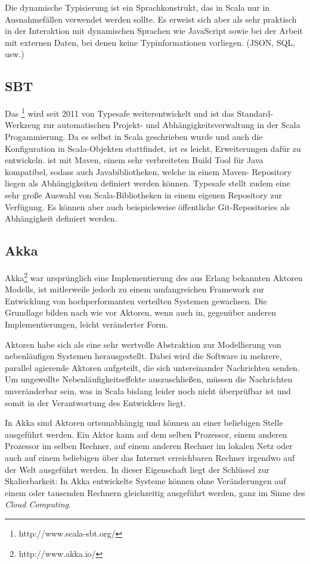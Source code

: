 Die dynamische Typisierung ist ein Sprachkonstrukt, das in Scala nur in Ausnahmefällen verwendet
werden sollte. Es erweist sich aber als sehr praktisch in der Interaktion mit dynamischen Sprachen
wie JavaScript sowie bei der Arbeit mit externen Daten, bei denen keine Typinformationen vorliegen.
(JSON, SQL, usw.)

\subsection{SBT}
\label{sec:sbt}

Das \footnote{http://www.scala-sbt.org/} wird seit 2011 von Typesafe weiterentwickelt und
ist das Standard-Werkzeug zur automatischen Projekt- und Abhängigkeitsverwaltung in der Scala
Progammierung. Da es selbst in Scala geschrieben wurde und auch die Konfiguration in Scala-Objekten
stattfindet, ist es leicht, Erweiterungen dafür zu entwickeln.  ist mit Maven, einem sehr
verbreiteten Build Tool für Java kompatibel, sodass auch Javabibliotheken, welche in einem Maven-
Repository liegen als Abhängigkeiten definiert werden können. Typesafe stellt zudem eine sehr große
Auswahl von Scala-Bibliotheken in einem eigenen Repository zur Verfügung. Es können aber auch
beispielsweise öffentliche Git-Repositories als Abhängigkeit definiert werden.

\subsection{Akka}
\label{sec:akka}

Akka\footnote{http://www.akka.io/} war ursprünglich eine Implementierung des aus Erlang bekannten
Aktoren Modells, ist mitlerweile jedoch zu einem umfangreichen Framework zur Entwicklung von
hochperformanten verteilten Systemen gewachsen. Die Grundlage bilden nach wie vor Aktoren, wenn auch
in, gegenüber anderen Implementierungen, leicht veränderter Form. \cite{actors}

Aktoren habe sich als eine sehr wertvolle Abstraktion zur Modellierung von nebenläufigen Systemen
herausgestellt. Dabei wird die Software in mehrere, parallel agierende Aktoren aufgeteilt, die
sich untereinander Nachrichten senden. Um ungewollte Nebenläufigkeitseffekte auszuschließen, müssen
die Nachrichten unveränderbar sein, was in Scala bislang leider noch nicht überprüfbar ist und somit
in der Verantwortung des Entwicklers liegt.

In Akka sind Aktoren ortsunabhängig und können an einer beliebigen Stelle ausgeführt werden. Ein
Aktor kann auf dem selben Prozessor, einem anderen Prozessor im selben Rechner, auf einem anderen
Rechner im lokalen Netz oder auch auf einem beliebigen über das Internet erreichbaren Rechner
irgendwo auf der Welt ausgeführt werden. In dieser Eigenschaft liegt der Schlüssel zur
Skalierbarkeit: In Akka entwickelte Systeme können ohne Veränderungen auf einem oder tausenden
Rechnern gleichzeitig ausgeführt werden, ganz im Sinne des \textit{Cloud Computing}.

